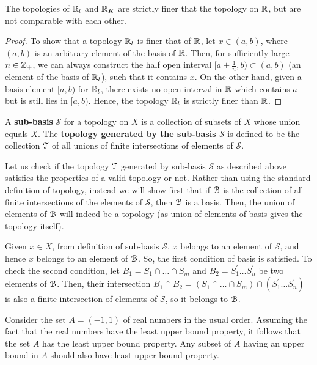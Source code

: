 \documentclass[a4paper,english,12pt]{article}
\begin{document}
\begin{lem}
The topologies of $\mathbb{R}_{l}$ and $\mathbb{R}_{K}$ are strictly finer that the topology on $\mathbb{R}$, but are not comparable with each other.
\end{lem}
\begin{proof}
To show that a topology $\mathbb{R}_{l}$ is finer that of $\mathbb{R}$, let $x \in (a, b)$, where $(a, b)$ is an arbitrary element of the basis of $\mathbb{R}$. Then, for sufficiently large $n \in \mathbb{Z}_{+}$, we can always construct the half open interval $[a + \frac{1}{n}, b) \subset (a,b)$ (an element of the basis of $\mathbb{R}_{l}$), such that it contains $x$. On the other hand, given a basis element $[a, b)$ for $\mathbb{R}_{l}$, there exists no open interval in $\mathbb{R}$ which contains $a$ but is still lies in $[a,b)$. Hence, the topology $\mathbb{R}_{l}$ is strictly finer than $\mathbb{R}$.
\end{proof}

\begin{defn} [Subbasis]
A \textbf{sub-basis} $\mathcal{S}$ for a topology on $X$ is a collection of subsets of $X$ whose union equals $X$. The \textbf{topology generated by the sub-basis $\mathcal{S}$} is defined to be the collection $\mathcal{T}$ of all unions of finite intersections of elements of $\mathcal{S}$.
\end{defn}

Let us check if the topology $\mathcal{T}$ generated by sub-basis $\mathcal{S}$ as described above satisfies the properties of a valid topology or not.
Rather than using the standard definition of topology, instead we will show first that if $\mathcal{B}$ is the collection of all finite intersections of the elements of $\mathcal{S}$, then $\mathcal{B}$ is a basis. Then, the union of elements of $\mathcal{B}$ will indeed be a topology (as union of elements of basis gives the topology itself).

Given $x \in X$, from definition of sub-basis $\mathcal{S}$, $x$ belongs to an element of $\mathcal{S}$, and hence $x$ belongs to an element of $\mathcal{B}$. So, the first condition of basis is satisfied. To check the second condition, let $B_{1} = S_{1} \cap \dots \cap S_{m}$ and $B_{2} = S_{1}^{'} \dots S_{n}^{'}$ be two elements of $\mathcal{B}$. Then, their intersection $B_{1} \cap B_{2} = (S_{1} \cap \dots \cap S_{m})  \cap (S_{1}^{'} \dots S_{n}^{'})$ is also a finite intersection of elements of $\mathcal{S}$, so it belongs to $\mathcal{B}$. 

\begin{exmp}
\begin{enumerate}[i)]
Consider the set $A = (-1, 1)$ of real numbers in the usual order. Assuming the fact that the real numbers have the least upper bound property, it follows that the set $A$ has the least upper bound property. Any subset of $A$ having an upper bound in $A$ should also have least upper bound property. 
\end{enumerate}
\end{exmp}
\end{document}
